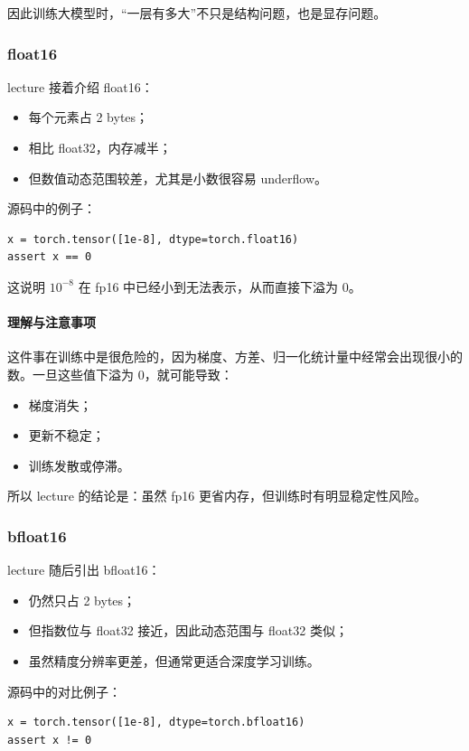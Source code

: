 \documentclass[a4paper,UTF8]{article}
\numberwithin{equation}{section}
\begin{document}
因此训练大模型时，“一层有多大”不只是结构问题，也是显存问题。

\subsubsection{float16}

lecture 接着介绍 float16：
\begin{itemize}
    \item 每个元素占 2 bytes；
    \item 相比 float32，内存减半；
    \item 但数值动态范围较差，尤其是小数很容易 underflow。
\end{itemize}

源码中的例子：
\begin{verbatim}
x = torch.tensor([1e-8], dtype=torch.float16)
assert x == 0
\end{verbatim}

这说明 \(10^{-8}\) 在 fp16 中已经小到无法表示，从而直接下溢为 0。

\paragraph{理解与注意事项}
这件事在训练中是很危险的，因为梯度、方差、归一化统计量中经常会出现很小的数。一旦这些值下溢为 0，就可能导致：
\begin{itemize}
    \item 梯度消失；
    \item 更新不稳定；
    \item 训练发散或停滞。
\end{itemize}

所以 lecture 的结论是：虽然 fp16 更省内存，但训练时有明显稳定性风险。

\subsubsection{bfloat16}

lecture 随后引出 bfloat16：
\begin{itemize}
    \item 仍然只占 2 bytes；
    \item 但指数位与 float32 接近，因此动态范围与 float32 类似；
    \item 虽然精度分辨率更差，但通常更适合深度学习训练。
\end{itemize}

源码中的对比例子：
\begin{verbatim}
x = torch.tensor([1e-8], dtype=torch.bfloat16)
assert x != 0
\end{verbatim}
\end{document}
